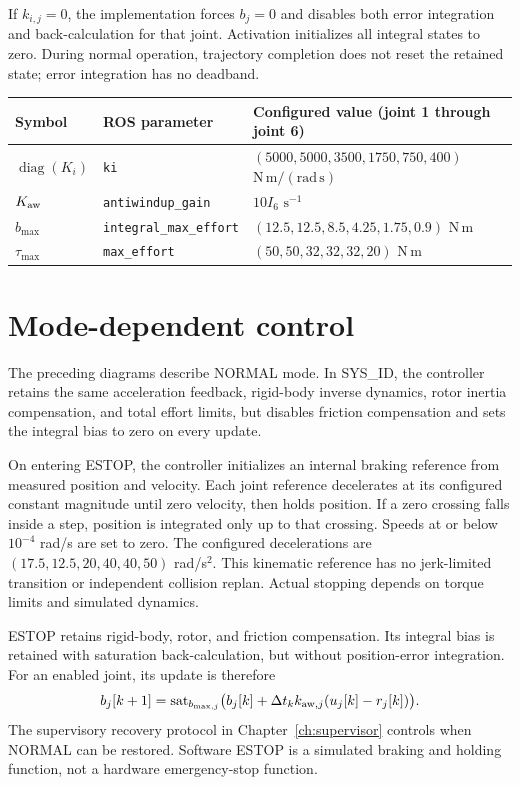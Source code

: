 \documentclass[11pt,a4paper]{report}
\newcommand{\diag}{\operatorname{diag}}
\newcommand{\sat}{\operatorname{sat}}
\begin{document}
\begin{landscape}
\medskip
If $k_{i,j}=0$, the implementation forces $b_j=0$ and disables both error
integration and back-calculation for that joint. Activation initializes all
integral states to zero. During normal operation, trajectory completion does
not reset the retained state; error integration has no deadband.

\begin{center}
\renewcommand{\arraystretch}{1.4}
\begin{tabular}{lll}
Symbol & ROS parameter & Configured value (joint 1 through joint 6)\\
\hline
$\diag(K_i)$ & \texttt{ki}
  & $(5000,5000,3500,1750,750,400)$ $\mathrm{N\,m/(rad\,s)}$\\
$K_{\rm aw}$ & \texttt{antiwindup\_gain} & $10I_6$ $\mathrm{s^{-1}}$\\
$b_{\max}$ & \texttt{integral\_max\_effort}
  & $(12.5,12.5,8.5,4.25,1.75,0.9)$ $\mathrm{N\,m}$\\
$\tau_{\max}$ & \texttt{max\_effort}
  & $(50,50,32,32,32,20)$ $\mathrm{N\,m}$
\end{tabular}
\end{center}

\end{landscape}
\restoregeometry

\section{Mode-dependent control}\label{sec:control-modes}
The preceding diagrams describe NORMAL mode. In SYS\_ID, the controller
retains the same acceleration feedback, rigid-body inverse dynamics, rotor
inertia compensation, and total effort limits, but disables friction
compensation and sets the integral bias to zero on every update.

On entering ESTOP, the controller initializes an internal braking reference
from measured position and velocity. Each joint reference decelerates at its
configured constant magnitude until zero velocity, then holds position.
If a zero crossing falls inside a step, position is integrated only up to
that crossing. Speeds at or below $10^{-4}$ rad/s are set to zero. The
configured decelerations are $(17.5,12.5,20,40,40,50)$ rad/s$^2$.
This kinematic reference has no jerk-limited transition or independent
collision replan. Actual stopping depends on torque limits and simulated
dynamics.

ESTOP retains rigid-body, rotor, and friction compensation. Its integral
bias is retained with saturation back-calculation, but without position-error
integration. For an enabled joint, its update is therefore
\[
 b_j[k+1]=\sat_{b_{\max,j}}\bigl(b_j[k]
 +\Delta t_k k_{{\rm aw},j}(u_j[k]-r_j[k])\bigr).
\]
The supervisory recovery protocol in Chapter~\ref{ch:supervisor} controls
when NORMAL can be restored. Software ESTOP is a simulated braking and
holding function, not a hardware emergency-stop function.
\end{document}

